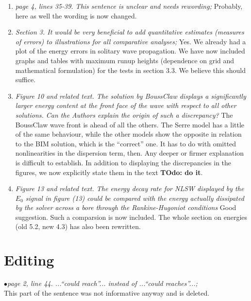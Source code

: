 \documentclass[11pt]{article}
\begin{document}
\begin{enumerate}
\item{\em page 4, lines 35-39. This sentence is unclear and needs rewording;}
Probably, here as well the wording is now changed.
\item{\em Section 3. It would be very beneficial to add quantitative estimates (measures of
errors) to illustrations for all comparative analyses;}
Yes. We already had a plot of the energy errors in solitary wave propagation.
We have now included graphs and tables with maximum runup heights (dependence on grid and mathematical formulation) for the tests in section 3.3. We believe this should suffice.  
\item{\em Figure 10 and related text. The solution by BoussClaw displays a significantly larger
energy content at the front face of the wave with respect to all other solutions. Can
the Authors explain the origin of such a discrepancy?}
The BoussClaw wave front is ahead of all the others. The Serre model has a little of the same
behaviour, while the other models show the opposite in relation to the BIM solution, which is
the ``correct'' one. It has to do with omitted nonlinearities in the dispersion term, then. Any deeper or firmer
explanation is difficult to establish. In addition to displaying the discrepancies in the figures, we now explicitly state them in the text {\bf TOdo: do it}. 
\item{\em Figure 13 and related text. The energy decay rate for NLSW displayed by the $E_0$
signal in figure (13) could be compared with the energy actually dissipated by the
solver across a bore through the Rankine-Hugoniot conditions}
Good suggestion. Such a comparsion is now included.
The whole section on energies (old 5.2, new 4.3) has also been rewritten.
\end{enumerate}
\section*{Editing}
$\bullet${\em  page 2, line 44. ...“could reach”... instead of ...“could reaches”...;}\\
This part of the sentence was not informative anyway and is deleted.

\end{document}
